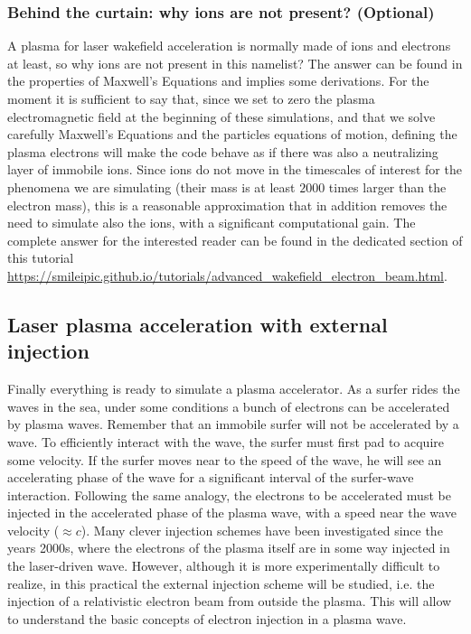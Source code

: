 \documentclass[a4paper,12pt]{extarticle}
\begin{document}
\subsubsection*{Behind the curtain: why ions are not present? (Optional)} A plasma for laser wakefield acceleration is normally made of ions and electrons at least, so why ions are not present in this namelist? The answer can be found in the properties of Maxwell's Equations and implies some derivations.  For the moment it is sufficient to say that, since we set to zero the plasma electromagnetic field at the beginning of these simulations, and that we solve carefully Maxwell's Equations and the particles equations of motion, defining the plasma electrons will make the code behave as if there was also a neutralizing layer of immobile ions. Since ions do not move in the timescales of interest for the phenomena we are simulating (their mass is at  least $2000$ times larger than the electron mass), this is a reasonable approximation that in addition removes the need to simulate also the ions, with a significant computational gain. The complete answer for the interested reader can be found in the dedicated section of this tutorial \url{https://smileipic.github.io/tutorials/advanced_wakefield_electron_beam.html}.

\subsection{Laser plasma acceleration with external injection}
Finally everything is ready to simulate a plasma accelerator. As a surfer rides the waves in the sea,  under some conditions a bunch of electrons can be accelerated by plasma waves. Remember that an immobile surfer will not be accelerated by a wave. To efficiently interact with the wave, the surfer must first pad to acquire some velocity. If the surfer moves near to the speed of the wave, he will see an accelerating phase of the wave for a significant interval of the surfer-wave interaction.
Following the same analogy,  the electrons to be accelerated must be injected in the accelerated phase of the plasma wave, with a speed near the wave velocity  ($\approx c$). Many clever injection schemes have been investigated since  the years 2000s, where the electrons of the plasma itself are in some way injected in the laser-driven wave. However, although it is more experimentally difficult to realize, in this practical the external injection scheme will be studied, i.e. the injection of a relativistic electron beam from outside the plasma. This will allow to understand the basic concepts of electron injection in a plasma wave. \\
\end{document}
